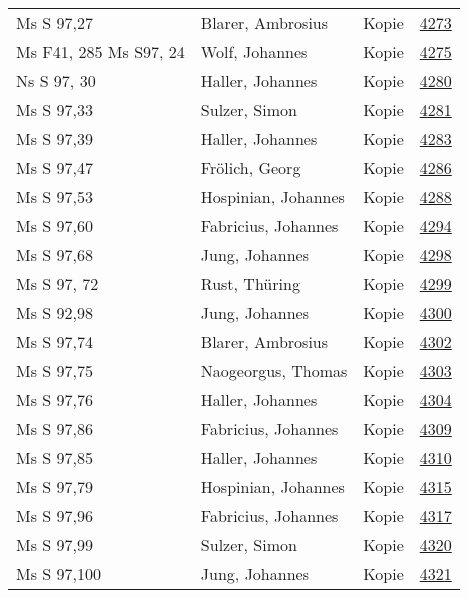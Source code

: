 \documentclass[10pt,a4paper,landscape]{report}
\begin{document}
\begin{longtable}{p{16cm}p{4cm}lr}
Ms S 97,27	&	Blarer, Ambrosius	&	Kopie	&	\href{http://130.60.24.72/assignment/4273}{4273}\\
Ms F41, 285  Ms S97, 24	&	Wolf, Johannes	&	Kopie	&	\href{http://130.60.24.72/assignment/4275}{4275}\\
Ns S 97, 30	&	Haller, Johannes	&	Kopie	&	\href{http://130.60.24.72/assignment/4280}{4280}\\
Ms S 97,33	&	Sulzer, Simon	&	Kopie	&	\href{http://130.60.24.72/assignment/4281}{4281}\\
Ms S 97,39	&	Haller, Johannes	&	Kopie	&	\href{http://130.60.24.72/assignment/4283}{4283}\\
Ms S 97,47	&	Frölich, Georg	&	Kopie	&	\href{http://130.60.24.72/assignment/4286}{4286}\\
Ms S 97,53	&	Hospinian, Johannes	&	Kopie	&	\href{http://130.60.24.72/assignment/4288}{4288}\\
Ms S 97,60	&	Fabricius, Johannes	&	Kopie	&	\href{http://130.60.24.72/assignment/4294}{4294}\\
Ms S 97,68	&	Jung, Johannes	&	Kopie	&	\href{http://130.60.24.72/assignment/4298}{4298}\\
Ms S 97, 72	&	Rust, Thüring	&	Kopie	&	\href{http://130.60.24.72/assignment/4299}{4299}\\
Ms S 92,98	&	Jung, Johannes	&	Kopie	&	\href{http://130.60.24.72/assignment/4300}{4300}\\
Ms S 97,74	&	Blarer, Ambrosius	&	Kopie	&	\href{http://130.60.24.72/assignment/4302}{4302}\\
Ms S 97,75	&	Naogeorgus, Thomas	&	Kopie	&	\href{http://130.60.24.72/assignment/4303}{4303}\\
Ms S 97,76	&	Haller, Johannes	&	Kopie	&	\href{http://130.60.24.72/assignment/4304}{4304}\\
Ms S 97,86	&	Fabricius, Johannes	&	Kopie	&	\href{http://130.60.24.72/assignment/4309}{4309}\\
Ms S 97,85	&	Haller, Johannes	&	Kopie	&	\href{http://130.60.24.72/assignment/4310}{4310}\\
Ms S 97,79	&	Hospinian, Johannes	&	Kopie	&	\href{http://130.60.24.72/assignment/4315}{4315}\\
Ms S 97,96	&	Fabricius, Johannes	&	Kopie	&	\href{http://130.60.24.72/assignment/4317}{4317}\\
Ms S 97,99	&	Sulzer, Simon	&	Kopie	&	\href{http://130.60.24.72/assignment/4320}{4320}\\
Ms S 97,100	&	Jung, Johannes	&	Kopie	&	\href{http://130.60.24.72/assignment/4321}{4321}\\

\end{longtable}
\end{document}

